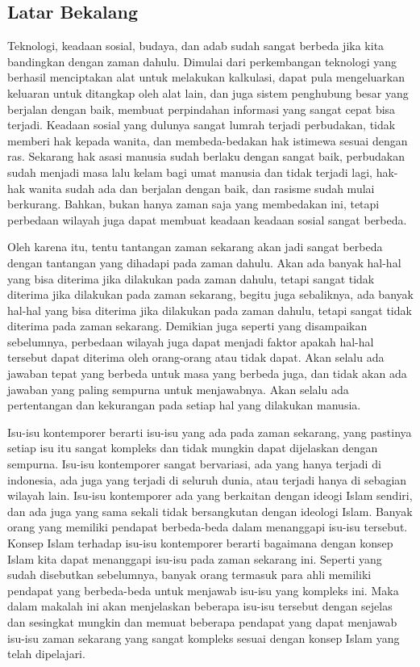\documentclass[a4paper,12 pt]{article}%
\begin{document}
\subsection{Latar Bekalang}
Teknologi, keadaan sosial, budaya, dan adab sudah sangat berbeda jika kita bandingkan dengan zaman 
dahulu. Dimulai dari perkembangan teknologi yang berhasil menciptakan alat untuk melakukan
kalkulasi, dapat pula mengeluarkan keluaran untuk ditangkap oleh alat lain, dan juga sistem
penghubung besar yang berjalan dengan baik, membuat perpindahan informasi yang sangat cepat 
bisa terjadi. Keadaan sosial yang dulunya sangat lumrah terjadi perbudakan, tidak memberi hak
kepada wanita, dan membeda-bedakan hak istimewa sesuai dengan ras. Sekarang hak asasi manusia sudah 
berlaku dengan sangat baik, perbudakan sudah menjadi masa lalu kelam bagi umat manusia dan tidak
terjadi lagi, hak-hak wanita sudah ada dan berjalan dengan baik, dan rasisme sudah mulai berkurang.
Bahkan, bukan hanya zaman saja yang membedakan ini, tetapi perbedaan wilayah juga dapat membuat
keadaan keadaan sosial sangat berbeda. 

Oleh karena itu, tentu tantangan zaman sekarang akan jadi sangat berbeda dengan tantangan yang 
dihadapi pada zaman dahulu. Akan ada banyak hal-hal yang bisa diterima jika dilakukan pada zaman
dahulu, tetapi sangat tidak diterima jika dilakukan pada zaman sekarang, begitu juga sebaliknya,
ada banyak hal-hal yang bisa diterima jika dilakukan pada zaman dahulu, tetapi sangat tidak 
diterima pada zaman sekarang. Demikian juga seperti yang disampaikan sebelumnya, perbedaan wilayah juga
dapat menjadi faktor apakah hal-hal tersebut dapat diterima oleh orang-orang atau tidak dapat. 
Akan selalu ada jawaban tepat yang berbeda untuk masa yang berbeda juga, dan tidak akan ada jawaban
yang paling sempurna untuk menjawabnya. Akan selalu ada pertentangan dan kekurangan pada setiap
hal yang dilakukan manusia.

Isu-isu kontemporer berarti isu-isu yang ada pada zaman sekarang, yang pastinya setiap
isu itu sangat kompleks dan tidak mungkin dapat dijelaskan dengan sempurna. Isu-isu kontemporer sangat bervariasi, ada yang hanya terjadi di indonesia, ada juga yang terjadi
di seluruh dunia, atau terjadi hanya di sebagian wilayah lain. Isu-isu kontemporer ada yang
berkaitan dengan ideogi Islam sendiri, dan ada juga yang sama sekali tidak bersangkutan dengan
ideologi Islam. Banyak orang yang memiliki pendapat berbeda-beda dalam menanggapi isu-isu tersebut. 
Konsep Islam terhadap isu-isu kontemporer berarti bagaimana dengan konsep Islam kita dapat 
menanggapi isu-isu pada zaman sekarang ini. Seperti yang sudah disebutkan sebelumnya, banyak 
orang termasuk para ahli memiliki pendapat yang berbeda-beda untuk menjawab isu-isu yang kompleks 
ini. Maka dalam makalah ini akan menjelaskan beberapa isu-isu tersebut dengan sejelas dan 
sesingkat mungkin dan memuat beberapa pendapat yang dapat menjawab isu-isu zaman sekarang 
yang sangat kompleks sesuai dengan konsep Islam yang telah dipelajari.
\end{document}
